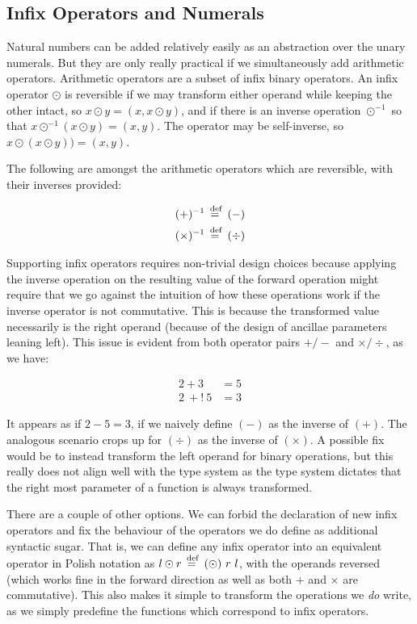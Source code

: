 \subsection{Infix Operators and Numerals}\label{subsec:numerals}

Natural numbers can be added relatively easily as an abstraction over the unary
numerals. But they are only really practical if we simultaneously add
arithmetic operators. Arithmetic operators are a subset of infix binary
operators. An infix operator $\odot$ is reversible if we may transform either
operand while keeping the other intact, so $x \odot y = (x, x \odot y)$, and if
there is an inverse operation $\odot^{-1}$ so that $x \odot^{-1} (x \odot y) =
(x, y)$. The operator may be self-inverse, so $x \odot (x \odot y)) =
(x, y)$.

The following are amongst the arithmetic operators which are reversible, with
their inverses provided:

\begin{align*}
  (+)^{-1} &\stackrel{\>\text{def}}{=}\> (-) \\
  (\times)^{-1} &\stackrel{\>\text{def}}{=}\> (\div) \\
\end{align*}

Supporting infix operators requires non-trivial design choices because applying
the inverse operation on the resulting value of the forward operation might
require that we go against the intuition of how these operations work if the
inverse operator is not commutative. This is because the transformed value
necessarily is the right operand (because of the design of ancillae parameters
leaning left). This issue is evident from both operator pairs $+/-$ and
$\times/\div$, as we have:

\begin{align*}
  2 + 3 &= 5 \\
  2~+!~5 &= 3
\end{align*}

It appears as if $2 - 5 = 3$, if we naively define $(-)$ as the inverse of
$(+)$. The analogous scenario crops up for $(\div)$ as the inverse of
$(\times)$.  A possible fix would be to instead transform the left operand for
binary operations, but this really does not align well with the type system as
the type system dictates that the right most parameter of a function is always
transformed.

There are a couple of other options. We can forbid the declaration of new infix
operators and fix the behaviour of the operators we do define as additional
syntactic sugar. That is, we can define any infix operator into an equivalent
operator in Polish notation as $l \odot r \stackrel{\>\text{def}}{=}\> (\odot)~r~l$, with the
operands reversed (which works fine in the forward direction as well as both
$+$ and $\times$ are commutative). This also makes it simple to transform the
operations we \emph{do} write, as we simply predefine the functions which
correspond to infix operators.


